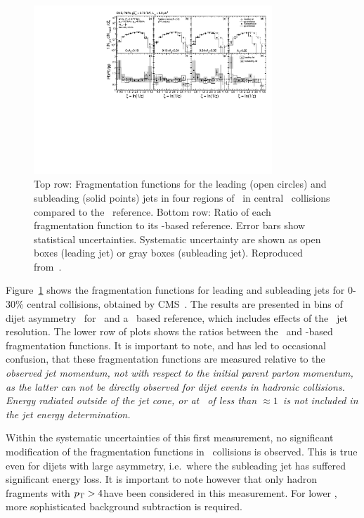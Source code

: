 \begin{figure}[!ht]
\begin{center}
\includegraphics[width=0.8\textwidth]{jetfigures/xsi_div_both_effv9_l100s40_0to12_dphi20eta20dr3pt4id1_cwt_ppDiv_gray.pdf}
\caption{Top row: Fragmentation functions for the leading (open circles) and subleading (solid points) 
jets in four regions of \AJ\ in central \PbPb\ collisions compared to the \pp\ reference.
Bottom row: Ratio of each fragmentation function to its \pp-based reference.
Error bars show statistical uncertainties. Systematic uncertainty are 
shown as open boxes (leading jet) or gray boxes (subleading jet).
Reproduced from~\cite{Chatrchyan:2012gw}.
}

\label{fig:GR:CMS_jetFF}
\end{center}
\end{figure}
Figure~\ref{fig:GR:CMS_jetFF} shows the fragmentation functions 
for leading and subleading jets for 0-30\% central collisions, obtained
by CMS~\cite{Chatrchyan:2012gw}. The results are presented in bins of 
dijet asymmetry \AJ\ for \PbPb\ and a \pp\ based reference,
which includes effects of the \PbPb\ jet resolution.
The lower row of plots shows the ratios between the \PbPb\
and \pp-based fragmentation functions. It is important to note, and has 
led to occasional confusion, that these fragmentation functions are 
measured relative to the \em observed \em jet momentum, not with respect
to the initial parent parton momentum, as the latter can not be directly observed
for dijet events in hadronic collisions.
Energy radiated outside of the jet cone, or at \pT\ of less than $\approx 1$\GeVc\
is not included in the jet energy determination.

Within the systematic uncertainties of this first measurement, no significant modification of
the fragmentation functions in \PbPb\ collisions is observed. This is true even for
dijets with large asymmetry, i.e.\ where the subleading jet has suffered significant
energy loss. It is important to note however that only hadron fragments 
with $\mbox{$p_{\mathrm{T}}$} > 4$\GeVc have been considered in this measurement. For lower \pT, more
sophisticated background subtraction is required. 


